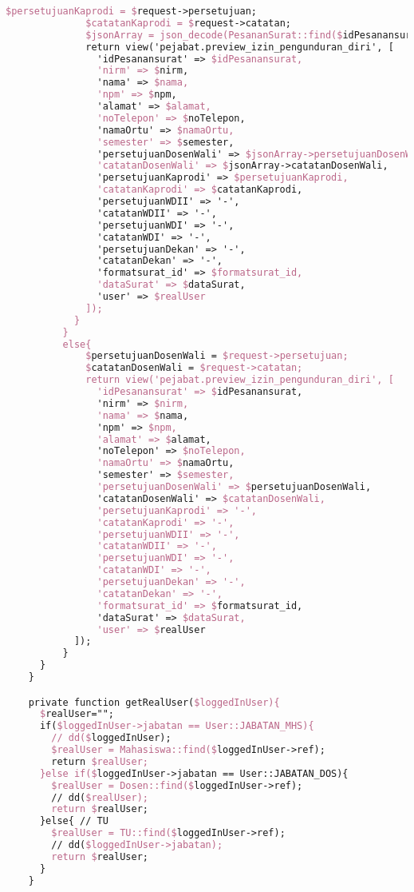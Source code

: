 \begin{lstlisting}[language=tex,basicstyle=\tiny,caption=PesanansuratController.php]
              $persetujuanKaprodi = $request->persetujuan;
              $catatanKaprodi = $request->catatan;
              $jsonArray = json_decode(PesananSurat::find($idPesanansurat)->dataSurat);
              return view('pejabat.preview_izin_pengunduran_diri', [
                'idPesanansurat' => $idPesanansurat,
                'nirm' => $nirm,
                'nama' => $nama,
                'npm' => $npm,
                'alamat' => $alamat,
                'noTelepon' => $noTelepon,
                'namaOrtu' => $namaOrtu,
                'semester' => $semester,
                'persetujuanDosenWali' => $jsonArray->persetujuanDosenWali,
                'catatanDosenWali' => $jsonArray->catatanDosenWali,
                'persetujuanKaprodi' => $persetujuanKaprodi,
                'catatanKaprodi' => $catatanKaprodi,
                'persetujuanWDII' => '-',
                'catatanWDII' => '-',
                'persetujuanWDI' => '-',
                'catatanWDI' => '-',
                'persetujuanDekan' => '-',
                'catatanDekan' => '-',
                'formatsurat_id' => $formatsurat_id,
                'dataSurat' => $dataSurat,
                'user' => $realUser
              ]);
            }
          }
          else{
              $persetujuanDosenWali = $request->persetujuan;
              $catatanDosenWali = $request->catatan;
              return view('pejabat.preview_izin_pengunduran_diri', [
                'idPesanansurat' => $idPesanansurat,
                'nirm' => $nirm,
                'nama' => $nama,
                'npm' => $npm,
                'alamat' => $alamat,
                'noTelepon' => $noTelepon,
                'namaOrtu' => $namaOrtu,
                'semester' => $semester,
                'persetujuanDosenWali' => $persetujuanDosenWali,
                'catatanDosenWali' => $catatanDosenWali,
                'persetujuanKaprodi' => '-',
                'catatanKaprodi' => '-',
                'persetujuanWDII' => '-',
                'catatanWDII' => '-',
                'persetujuanWDI' => '-',
                'catatanWDI' => '-',
                'persetujuanDekan' => '-',
                'catatanDekan' => '-',
                'formatsurat_id' => $formatsurat_id,
                'dataSurat' => $dataSurat,
                'user' => $realUser
            ]);
          }   
      }
    }

    private function getRealUser($loggedInUser){
      $realUser="";
      if($loggedInUser->jabatan == User::JABATAN_MHS){
        // dd($loggedInUser);
        $realUser = Mahasiswa::find($loggedInUser->ref);
        return $realUser;
      }else if($loggedInUser->jabatan == User::JABATAN_DOS){
        $realUser = Dosen::find($loggedInUser->ref);
        // dd($realUser);
        return $realUser;
      }else{ // TU
        $realUser = TU::find($loggedInUser->ref);
        // dd($loggedInUser->jabatan);
        return $realUser;
      }
    }


\end{lstlisting}
